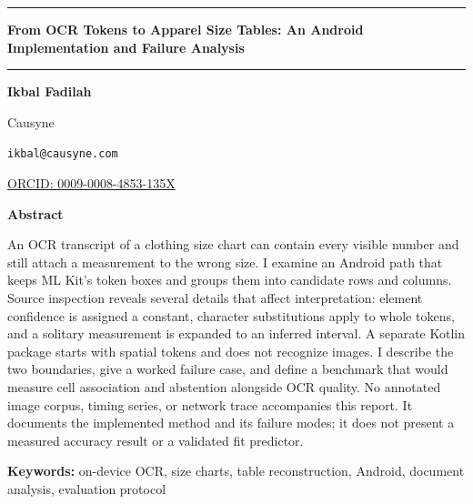 \documentclass[10pt,letterpaper]{article}
\begin{document}
\begin{center}

\rule{\textwidth}{0.8pt}\par\vspace{0.6em}

{\LARGE\bfseries From OCR Tokens to Apparel Size Tables: An Android Implementation and Failure Analysis\par}

\vspace{0.6em}\rule{\textwidth}{0.4pt}\par\vspace{1.2em}

{\normalsize\bfseries Ikbal Fadilah\par}

Causyne\par

\texttt{ikbal@causyne.com}\par
\href{https://orcid.org/0009-0008-4853-135X}{ORCID: 0009-0008-4853-135X}\par

\end{center}

\vspace{1.0em}

\begin{center}

\begin{minipage}{0.82\textwidth}

\begin{center}\bfseries Abstract\end{center}

An OCR transcript of a clothing size chart can contain every visible number and still attach a measurement to the wrong size. I examine an Android path that keeps ML Kit's token boxes and groups them into candidate rows and columns. Source inspection reveals several details that affect interpretation: element confidence is assigned a constant, character substitutions apply to whole tokens, and a solitary measurement is expanded to an inferred interval. A separate Kotlin package starts with spatial tokens and does not recognize images. I describe the two boundaries, give a worked failure case, and define a benchmark that would measure cell association and abstention alongside OCR quality. No annotated image corpus, timing series, or network trace accompanies this report. It documents the implemented method and its failure modes; it does not present a measured accuracy result or a validated fit predictor.

\par\vspace{0.45em}\noindent\textbf{Keywords:}  on-device OCR, size charts, table reconstruction, Android, document analysis, evaluation protocol\par

\end{minipage}

\end{center}
\end{document}
